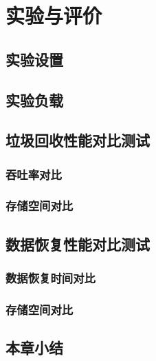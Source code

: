 
\chapter{实验与评价}




\section{实验设置}

\section{实验负载}

\section{垃圾回收性能对比测试}

\subsection{吞吐率对比}

\subsection{存储空间对比}

\section{数据恢复性能对比测试}

\subsection{数据恢复时间对比}

\subsection{存储空间对比}

\section{本章小结}


